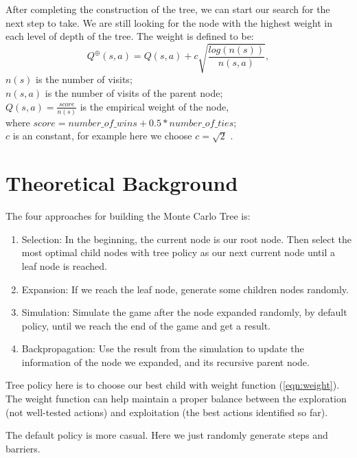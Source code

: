 \documentclass[twoside,11pt]{article}
\begin{document}
After completing the construction of the tree, we can start our search for the next step to take. We are still looking for the node with the highest weight in each level of depth of the tree. The weight is defined to be:
\begin{equation}
\label{eqn:weight}
Q^{\oplus}(s,a)=Q(s,a)+c\sqrt{ \frac{log(n(s))}{n(s,a)} },
\end{equation}
\(n(s)\) is the number of visits;\\
\(n(s,a)\) is the number of visits of the parent node;\\
\(Q(s,a)=\frac{score}{n(s)}\) is the empirical weight of the node, \\where \(score=number\_of\_ wins + 0.5*number\_of\_ties\);\\
\(c\) is an constant, for example here we choose \(c=\sqrt{2}\) .\\

\section{Theoretical Background}
 \label{sec:Theoretical_Background}
The four approaches for building the Monte Carlo Tree is:\cite{Intro2019}
\begin{enumerate}
\item Selection: In the beginning, the current node is our root node. Then select the most optimal child nodes with tree policy as our next current node until a leaf node is reached.
\item Expansion: If we reach the leaf node, generate some children nodes randomly.
\item Simulation: Simulate the game after the node expanded randomly, by default policy, until we reach the end of the game and get a result.
\item Backpropagation: Use the result from the simulation to update the information of the node we expanded, and its recursive parent node.
\end{enumerate}

Tree policy here is to choose our best child with weight function (\ref{eqn:weight}). The weight function can help maintain a proper balance between the exploration (not well-tested actions) and exploitation (the best actions identified so far).\cite{DBLP2021}

The default policy is more casual. Here we just randomly generate steps and barriers.
\end{document}
